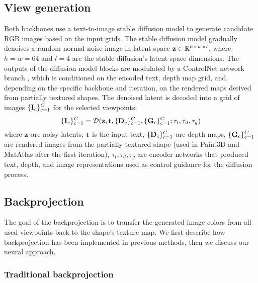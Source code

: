 \subsection{View generation}
Both backbones use a text-to-image  stable diffusion model \cite{Rombach:2022:High} to generate candidate RGB images based on the input grids.
The stable diffusion model gradually denoises a random normal noise image in latent space
$\mathbf{z} \in \mathbb{R}^{h\times w \times l}$, where ${h=w=64}$ and $l=4$ are the stable diffusion's latent space dimensions. The outputs of the diffusion model blocks are modulated by a ControlNet network branch \cite{Zhang:2023:ControlNet}, which is conditioned on the encoded text, depth map grid, and, depending on the specific backbone and iteration, on the rendered maps derived from partially textured shapes.
The denoised latent is decoded into a grid of images $\{\mathbf{I}_c\}_{c=1}^C$ for the selected viewpoints:
\begin{equation}
\{\mathbf{I}_c\}_{c=1}^C = \mathcal{D}( \mathbf{z}, \mathbf{t}, \{\mathbf{D}_c\}_{c=1}^C, \{\mathbf{G}_c\}_{c=1}^C
; \tau_{t}, \tau_{d}, \tau_{g})
\end{equation}
where $\mathbf{z}$ are noisy latents, $\mathbf{t}$ is the input text, $\{\mathbf{D}_c\}_{c=1}^C$ are depth maps, $\{\mathbf{G}_c\}_{c=1}^C$ are rendered images from the partially textured shape (used in Paint3D and MatAtlas after the first iteration), 
$\tau_{t}, \tau_{d}, \tau_{g}$ are encoder networks that produced text, depth, and image representations used as control guidance for the diffusion process.

\subsection{Backprojection}
\label{sec:backprojection}

The goal of the backprojection is to transfer the generated image colors from all used viewpoints 
back to the shape's texture map. We first describe how backprojection has been implemented in previous methods, then we discuss our neural approach. 

\subsubsection{Traditional backprojection}
